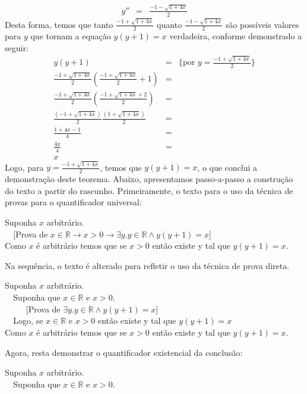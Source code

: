\begin{Example}
\[\begin{array}{lcl}
y'' & = & \frac{-1 - \sqrt{1 + 4x}}{2}
\end{array}
\]
Desta forma, temos que tanto $\frac{-1 + \sqrt{1 + 4x}}{2}$ quanto
$\frac{-1 - \sqrt{1 + 4x}}{2}$ são possíveis valores para $y$ que
tornam a equação $y(y+1) = x$ verdadeira, conforme demonstrado a
seguir:
\[
\begin{array}{lcl}
y(y+1) & = &\{\text{por }y = \frac{-1 + \sqrt{1 + 4x}}{2}\}\\
\frac{-1 + \sqrt{1 + 4x}}{2}\left(\frac{-1 + \sqrt{1 + 4x}}{2} +
  1\right) & = &\\
\frac{-1 + \sqrt{1 + 4x}}{2}\left(\frac{-1 + \sqrt{1 + 4x} + 2}{2}
\right) & = \\
\frac{(-1 + \sqrt{1 + 4x})}{2}\frac{(1 + \sqrt{1 + 4x})}{2} & =\\
\frac{1 + 4x - 1}{4} & =\\
\frac{4x}{4} & = \\
x
\end{array}
\]
Logo, para $y = \frac{-1 + \sqrt{1 + 4x}}{2}$, temos que $y(y+1) = x$,
o que conclui a demonstração deste teorema. Abaixo, apresentamos
passo-a-passo a construção do texto a partir do
rascunho. Primeiramente, o texto para o uso da técnica de provas para
o quantificador universal:
\begin{flushleft}
Suponha $x$ arbitrário.\\
\verb|  |[Prova de $x\in\mathbb{R}\to x > 0 \to \exists
y.y\in\mathbb{R}\land y(y + 1) = x$]\\
Como $x$ é arbitrário temos que se $x > 0$ então existe y tal que
$y(y+1) = x$.
\end{flushleft}
Na sequência, o texto é alterado para refletir o uso da técnica de
prova direta.
\begin{flushleft}
Suponha $x$ arbitrário.\\
\verb|  |Suponha que $x \in \mathbb{R}$ e $x> 0$.\\
\verb|     |[Prova de $\exists y.y\in\mathbb{R}\land y(y + 1) = x$]\\
\verb|  |Logo, se $x \in \mathbb{R}$ e $x> 0$ então existe y tal que
$y(y+1) = x$\\
Como $x$ é arbitrário temos que se $x > 0$ então existe y tal que
$y(y+1) = x$.
\end{flushleft}
Agora, resta demonstrar o quantificador existencial da conclusão:
\begin{flushleft}
Suponha $x$ arbitrário.\\
\verb|  |Suponha que $x \in \mathbb{R}$ e $x> 0$.\\

\end{flushleft}
\end{Example}
